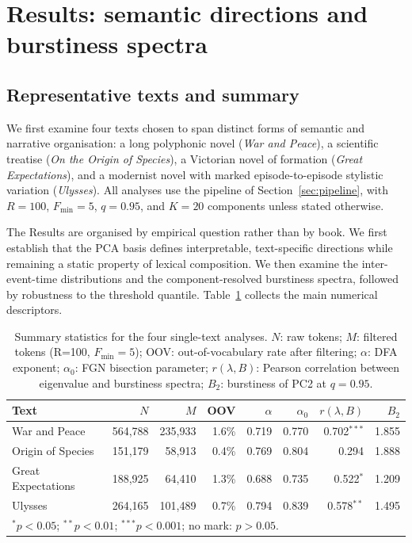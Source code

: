 \documentclass[12pt,a4paper]{article}
\begin{document}
\section{Results: semantic directions and burstiness spectra}
\label{sec:oliver}

\subsection{Representative texts and summary}
\label{sec:representative_summary}

We first examine four texts chosen to span distinct forms of semantic
and narrative organisation: a long polyphonic novel (\emph{War and
Peace}), a scientific treatise (\emph{On the Origin of Species}), a
Victorian novel of formation (\emph{Great Expectations}), and a
modernist novel with marked episode-to-episode stylistic variation
(\emph{Ulysses}). All analyses use the pipeline of
Section~\ref{sec:pipeline}, with $R=100$, $F_{\min}=5$, $q=0.95$, and
$K=20$ components unless stated otherwise.

The Results are organised by empirical question rather than by book.
We first establish that the PCA basis defines interpretable,
text-specific directions while remaining a static property of lexical
composition. We then examine the inter-event-time distributions and the
component-resolved burstiness spectra, followed by robustness to the
threshold quantile. Table~\ref{tab:single_text_summary} collects the
main numerical descriptors.

\begin{table}[htbp]
\centering
\caption{Summary statistics for the four single-text analyses.
$N$: raw tokens; $M$: filtered tokens (R=100, $F_{\min}=5$);
OOV: out-of-vocabulary rate after filtering;
$\alpha$: DFA exponent; $\alpha_0$: FGN bisection parameter;
$r(\lambda, B)$: Pearson correlation between eigenvalue and
burstiness spectra; $B_2$: burstiness of PC2 at $q=0.95$.}
\label{tab:single_text_summary}
\small
\begin{tabular}{lrrrrrrr}
\toprule
Text & $N$ & $M$ & OOV & $\alpha$ & $\alpha_0$ &
      $r(\lambda,B)$ & $B_2$ \\
\midrule
War and Peace     & 564{,}788 & 235{,}933 & 1.6\% &
  0.719 & 0.770 & 0.702$^{***}$ & 1.855 \\
Origin of Species & 151{,}179 &  58{,}913 & 0.4\% &
  0.769 & 0.804 & 0.294          & 1.888 \\
Great Expectations & 188{,}925 & 64{,}410 & 1.3\% &
  0.688 & 0.735 & 0.522$^{*}$   & 1.209 \\
Ulysses           & 264{,}165 & 101{,}489 & 0.7\% &
  0.794 & 0.839 & 0.578$^{**}$  & 1.495 \\
\bottomrule
\multicolumn{8}{l}{\small $^*p<0.05$;\; $^{**}p<0.01$;\;
  $^{***}p<0.001$;\; no mark: $p>0.05$.}
\end{tabular}
\end{table}
\end{document}
